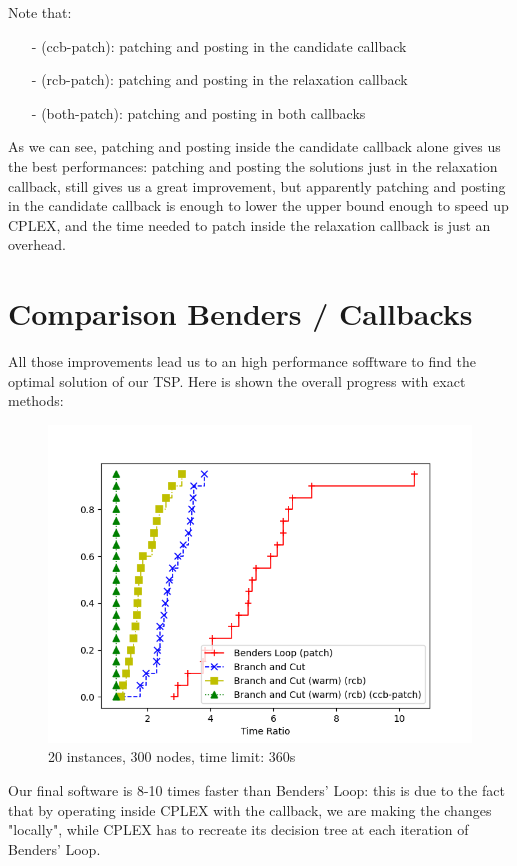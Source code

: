 Note that:
\begin{itemize}
    \item[-] (ccb-patch): patching and posting in the candidate callback
    \item[-] (rcb-patch): patching and posting in the relaxation callback
    \item[-] (both-patch): patching and posting in both callbacks
\end{itemize}

As we can see, patching and posting inside the candidate callback alone gives us the best performances: patching and posting the solutions just in the relaxation callback, still gives us a great improvement, but apparently patching and posting in the candidate callback is enough to lower the upper bound enough to speed up CPLEX, and the time needed to patch inside the relaxation callback is just an overhead.

\newpage

\section{Comparison Benders / Callbacks}
All those improvements lead us to an high performance sofftware to find the optimal solution of our TSP. Here is shown the overall progress with exact methods:

\FloatBarrier
\begin{figure}[h]
    \centering
    \includegraphics*[width=.6\textwidth]{../plots/perfprof_exact_times_result.png}
    \caption*{20 instances, 300 nodes, time limit: 360s}
\end{figure}
\FloatBarrier

Our final software is 8-10 times faster than Benders' Loop: this is due to the fact that by operating inside CPLEX with the callback, we are making the changes "locally", while CPLEX has to recreate its decision tree at each iteration of Benders' Loop.